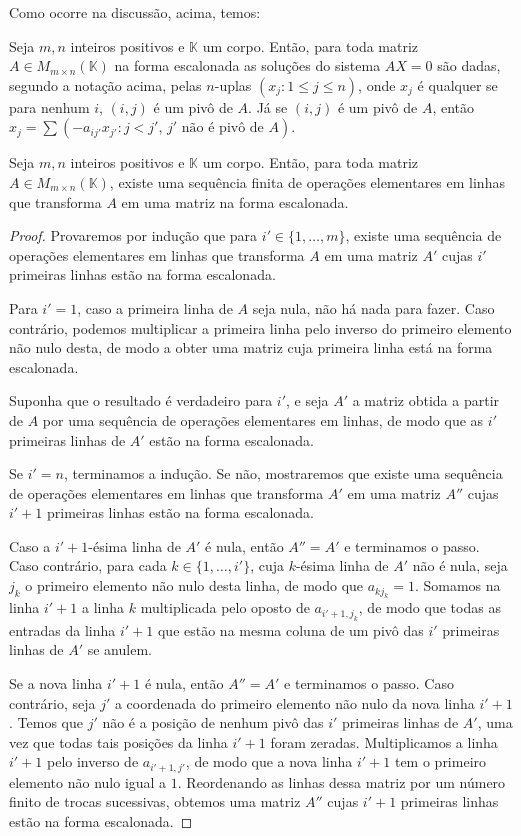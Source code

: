 Como ocorre na discussão, acima, temos:

\begin{theorem}
    Seja $m, n$ inteiros positivos e $\mathbb K$ um corpo.
    Então, para toda matriz $A\in M_{m \times n}(\mathbb K)$ na forma escalonada as soluções do sistema $AX=0$ são dadas, segundo a notação acima, pelas $n$-uplas
    $(x_j: 1\leq j\leq n)$, onde $x_j$ é qualquer se para nenhum $i$, $(i, j)$ é um pivô de $A$. Já se $(i, j)$ é um pivô de $A$, então $x_j=\sum\left(-a_{ij'}x_{j'}: j<j',\, j' \text{ não é pivô de } A\right)$.
\end{theorem}

\begin{theorem}
    Seja $m, n$ inteiros positivos e $\mathbb K$ um corpo.
    Então, para toda matriz $A\in M_{m \times n}(\mathbb K)$, existe uma sequência finita de operações elementares em linhas que transforma $A$ em uma matriz na forma escalonada.
\end{theorem}
\begin{proof}
    Provaremos por indução que para $i' \in \{1, \ldots, m\}$, existe uma sequência de operações elementares em linhas que transforma $A$ em uma matriz $A'$ cujas $i'$ primeiras linhas estão na forma escalonada.

    Para $i'=1$, caso a primeira linha de $A$ seja nula, não há nada para fazer.
    Caso contrário, podemos multiplicar a primeira linha pelo inverso do primeiro elemento não nulo desta, de modo a obter uma matriz cuja primeira linha está na forma escalonada.

    Suponha que o resultado é verdadeiro para $i'$, e seja $A'$ a matriz obtida a partir de $A$ por uma sequência de operações elementares em linhas, de modo que as $i'$ primeiras linhas de $A'$ estão na forma escalonada.

    Se $i'=n$, terminamos a indução. Se não, mostraremos que existe uma sequência de operações elementares em linhas que transforma $A'$ em uma matriz $A''$ cujas $i'+1$ primeiras linhas estão na forma escalonada.

    Caso a $i'+1$-ésima linha de $A'$ é nula, então $A''=A'$ e terminamos o passo.
    Caso contrário, para cada $k \in \{1, \ldots, i'\}$, cuja $k$-ésima linha de $A'$ não é nula, seja $j_k$ o primeiro elemento não nulo desta linha, de modo que $a_{kj_k}=1$.
    Somamos na linha $i'+1$ a linha $k$ multiplicada pelo oposto de $a_{i'+1, j_k}$, de modo que todas as entradas da linha $i'+1$ que estão na mesma coluna de um pivô das $i'$ primeiras linhas de $A'$ se anulem.

    Se a nova linha $i'+1$ é nula, então $A''=A'$ e terminamos o passo.
    Caso contrário, seja $j'$ a coordenada do primeiro elemento não nulo da nova linha $i'+1$.
    Temos que $j'$ não é a posição de nenhum pivô das $i'$ primeiras linhas de $A'$, uma vez que todas tais posições da linha $i'+1$ foram zeradas.
    Multiplicamos a linha $i'+1$ pelo inverso de $a_{i'+1, j'}$, de modo que a nova linha $i'+1$ tem o primeiro elemento não nulo igual a $1$.
    Reordenando as linhas dessa matriz por um número finito de trocas sucessivas, obtemos uma matriz $A''$ cujas $i'+1$ primeiras linhas estão na forma escalonada.
\end{proof}

